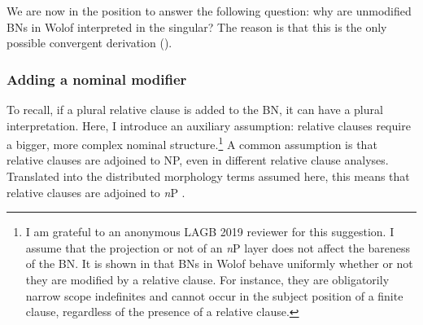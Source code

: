 \documentclass[output=paper]{langscibook}
\begin{document}
			
%		
%		
			
We are now in the position to answer the following question: why are unmodified BNs in Wolof interpreted in the singular? The reason is that this is the only possible convergent derivation ().

\subsubsection{Adding a nominal modifier}

To recall, if a plural relative clause is added to the BN, it can have a plural interpretation. Here, I introduce an auxiliary assumption: relative clauses require a bigger, more complex nominal structure.\footnote{I am grateful to an anonymous LAGB 2019 reviewer for this suggestion. I assume that the projection or not of an \textit{n}P layer does not affect the bareness of the BN. It is shown in \citet{fong2020} that BNs in Wolof behave uniformly whether or not they are modified by a relative clause. For instance, they are obligatorily narrow scope indefinites and cannot occur in the subject position of a finite clause, regardless of the presence of a relative clause.} A common assumption is that relative clauses are adjoined to NP, even in different relative clause analyses. Translated into the distributed morphology terms assumed here, this means that relative clauses are adjoined to \textit{n}P \citep{havenhill2016relative}.
 
\end{document}
